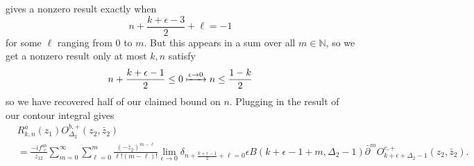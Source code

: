\documentclass[11pt,letterpaper]{article}
\newcommand{\LP}{\left(}
\newcommand{\RP}{\right)}
\newcommand{\N}{\mathbb{N}}
\newcommand{\D}{\partial}
\begin{document}
gives a nonzero result exactly when \begin{equation}
n + \frac{k + \epsilon - 3}{2} + \ell = -1
\end{equation}
for some $\ell$ ranging from $0$ to $m$. But this appears in a sum over all $m \in \N$, so we get a nonzero result only at most $k,n$ satisfy \begin{equation}
n + \frac{k + \epsilon - 1}{2} \leq 0 \xmapsto{\epsilon \to 0} n \leq \frac{1-k}{2}
\end{equation}
so we have recovered half of our claimed bound on $n$. Plugging in the result of our contour integral gives \begin{equation}
\begin{aligned}
& R^a_{k,n} (z_1) O^{b,+}_{\Delta_2} (z_2, \bar{z}_2) \\
& = \frac{- i f^{ab}_{ \ \ c}}{z_{12}} \sum_{m=0}^\infty \sum_{\ell = 0}^m \frac{(- \bar{z}_2)^{m - \ell}}{\ell! (m-\ell)!} \lim_{\epsilon \to 0} \delta_{n + \frac{k + \epsilon - 1}{2} + \ell = 0} \epsilon B(k + \epsilon - 1 + m, \Delta_2 - 1) \bar{\D}^m O^{c,+}_{k + \epsilon + \Delta_2 - 1}(z_2, \bar{z}_2).
\end{aligned}
\end{equation}
\end{document}
